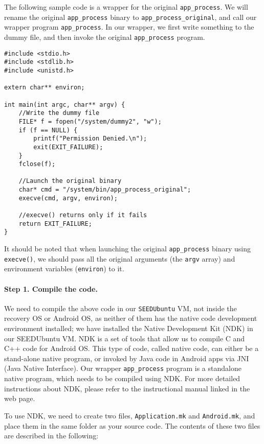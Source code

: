 The following sample code is a wrapper for the original \texttt{app\_process}. 
We will rename the original \texttt{app\_process} binary to \texttt{app\_process\_original},      
and call our wrapper program \texttt{app\_process}. In our wrapper, we first 
write something to the dummy file, and then invoke the original \texttt{app\_process} program. 


\begin{lstlisting}[frame=single, caption={}, label=label]
#include <stdio.h>  
#include <stdlib.h> 
#include <unistd.h> 

extern char** environ;

int main(int argc, char** argv) {
    //Write the dummy file
    FILE* f = fopen("/system/dummy2", "w");
    if (f == NULL) {
        printf("Permission Denied.\n");
        exit(EXIT_FAILURE);
    }
    fclose(f);
    
    //Launch the original binary
    char* cmd = "/system/bin/app_process_original";
    execve(cmd, argv, environ);
    
    //execve() returns only if it fails
    return EXIT_FAILURE;
}
\end{lstlisting}

It should be noted that when launching the original \texttt{app\_process} binary using 
\texttt{execve()}, we should pass all the original arguments (the \texttt{argv} array) 
and environment variables (\texttt{environ}) to it. 


\paragraph{Step 1. Compile the code.}
We need to compile the above code in our \texttt{SEEDUbuntu} VM, not inside the recovery OS or Android
OS, as neither of them has the native code development environment installed; we have installed the 
Native Development Kit (NDK) in our SEEDUbuntu VM. 
NDK is a set of tools that allow us to compile C and C++ code for Android OS. This type of
code, called native code, can either be a stand-alone native program, or invoked by
Java code in Android apps via JNI (Java Native Interface). 
Our wrapper \texttt{app\_process} program is a standalone native program, which needs to
be compiled using NDK. For more detailed instructions about NDK, please refer to the
instructional manual linked in the web page. 



To use NDK, we need to create two files, \texttt{Application.mk} and \texttt{Android.mk},
and place them in the same folder as your source code. The
contents of these two files are described in the following:



